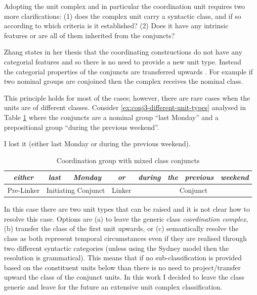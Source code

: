 Adopting the unit complex and in particular the coordination unit requires two more clarifications: (1) does the complex unit carry a syntactic class, and if so according to which criteria is it established? (2) Does it have any intrinsic features or are all of them inherited from the conjuncts?

Zhang states in her thesis that the coordinating constructions do not have any categorial features and so there is no need to provide a new unit type. Instead the categorial properties of the conjuncts are transferred upwards \citep{NinaZhang2010}. For example if two nominal groups are conjoined then the complex receives the nominal class.  

This principle holds for most of the cases; however, there are rare cases when the units are of different classes. Consider \ref{ex:conj3-different-unit-types} analysed in Table \ref{tab:mixed-coordination} where the conjuncts are a nominal group ``last Monday'' and a prepositional group ``during the previous weekend''.

\begin{exe}
	\ex\label{ex:conj3-different-unit-types}
	I lost it (either last Monday or during the previous weekend). 
\end{exe}

\begin{table}[!ht]
    \centering
    \begin{tabular}{|c|c|c|c|c|c|c|c|}
        \hline
        \textit{either} & \textit{last} & \textit{Monday} & \textit{or} & \textit{during} & \textit{the} & \textit{previous} & \textit{weekend} \\ \hline
        Pre-Linker & \multicolumn{2}{c|}{Initiating Conjunct} & Linker & \multicolumn{4}{c|}{Conjunct} \\ \hline
    \end{tabular}
    \caption{Coordination group with mixed class conjuncts}
    \label{tab:mixed-coordination}
\end{table}

In this case there are two unit types that can be raised and it is not clear how to resolve this case. Options are (a) to leave the generic class \textit{coordination complex}, (b) transfer the class of the first unit upwards, or (c) semantically resolve the class as both represent temporal circumstances even if they are realised through two different syntactic categories (unless using the Sydney model then the resolution is grammatical). This means that if no sub-classification is provided based on the constituent units below than there is no need to project/transfer upward the class of the conjunct units. In this work I decided to leave the class generic and leave for the future an extensive unit complex classification.

